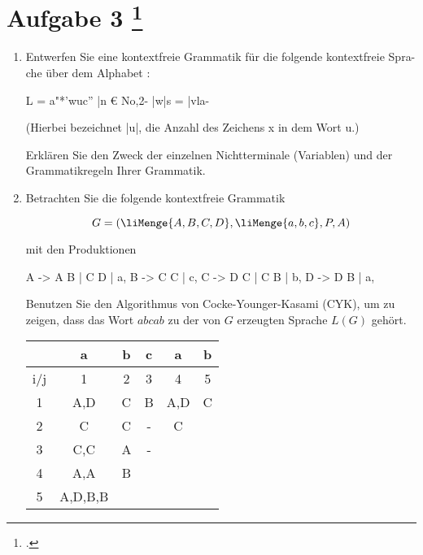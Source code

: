 \documentclass{lehramt-informatik-aufgabe}
\begin{document}
\let\m=\liMenge
{}
\section{Aufgabe 3
\footcite{66115:2020:03}}

\begin{enumerate}

\item Entwerfen Sie eine kontextfreie Grammatik für die folgende kontextfreie Spra-
che über dem Alphabet :

L = {a"*’wuc” |n € No,2- |w|s = |vla}-

(Hierbei bezeichnet |u|, die Anzahl des Zeichens x in dem Wort u.)

Erklären Sie den Zweck der einzelnen Nichtterminale (Variablen) und der Grammatikregeln
Ihrer Grammatik.


\item Betrachten Sie die folgende kontextfreie Grammatik

\begin{displaymath}
G=(\m{A,B,C,D}, \m{a,b,c}, P, A)
\end{displaymath}

mit den Produktionen

\begin{liProduktionsRegeln}
A -> A B | C D | a,
B -> C C | c,
C -> D C | C B | b,
D -> D B | a,
\end{liProduktionsRegeln}

Benutzen Sie den Algorithmus von Cocke-Younger-Kasami (CYK), um zu
zeigen, dass das Wort $abcab$ zu der von $G$ erzeugten Sprache $L(G)$
gehört.

\begin{liAntwort}
\begin{tabular}{|c||c|c|c|c|c|}
\hline
    & a    & b    & c    & a    & b \\
\hline
i/j & 1    & 2    & 3    & 4    & 5 \\\hline\hline
1   & A,D  & C    & B    & A,D  & C \\\cline{1-6}
2   & C    & C    & -    & C    \\\cline{1-5}
3   & C,C  & A    & -    \\\cline{1-4}
4   & A,A  & B    \\\cline{1-3}
5   & A,D,B,B \\\cline{1-2}
\end{tabular}
\end{liAntwort}


\end{enumerate}
\end{document}
